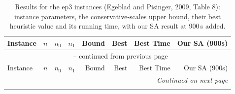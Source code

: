 \begin{longtable}{lrrrrrrr}
  \caption{Results for the ep3 instances (Egeblad and Pisinger, 2009,
    Table 8): instance parameters, the conservative-scales upper bound,
    their best heuristic value and its running time, with our SA result
    at 900\,s added.}
  \label{tab:ep3-results} \\
  \toprule
  Instance & $n$ & $n_0$ & $n_1$ & Bound & Best & Best Time & Our SA (900s) \\
  \midrule
  \endfirsthead

  \multicolumn{8}{c}{{\tablename\ \thetable{} -- continued from previous page}} \\
  \toprule
  Instance & $n$ & $n_0$ & $n_1$ & Bound & Best & Best Time & Our SA (900s) \\
  \midrule
  \endhead

  \midrule
  \multicolumn{8}{r}{\emph{Continued on next page}} \\
  \endfoot

  \bottomrule
  \endlastfoot


\end{longtable}
